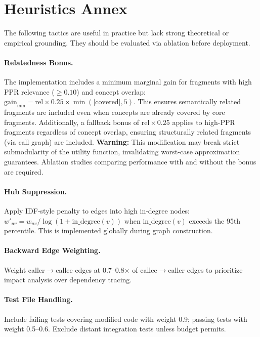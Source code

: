 \documentclass[11pt, a4paper]{article}
\begin{document}
\newpage
\section{Heuristics Annex}

The following tactics are useful in practice but lack strong theoretical or empirical grounding. They should be evaluated via ablation before deployment.

\paragraph{Relatedness Bonus.} The implementation includes a minimum marginal gain for fragments with high PPR relevance ($\geq 0.10$) and concept overlap: $\text{gain}_{\min} = \text{rel} \times 0.25 \times \min(|\text{covered}|, 5)$. This ensures semantically related fragments are included even when concepts are already covered by core fragments. Additionally, a fallback bonus of $\text{rel} \times 0.25$ applies to high-PPR fragments regardless of concept overlap, ensuring structurally related fragments (via call graph) are included. \textbf{Warning:} This modification may break strict submodularity of the utility function, invalidating worst-case approximation guarantees. Ablation studies comparing performance with and without the bonus are required.

\paragraph{Hub Suppression.} Apply IDF-style penalty to edges into high in-degree nodes: $w'_{uv} = w_{uv} / \log(1 + \text{in\_degree}(v))$ when $\text{in\_degree}(v)$ exceeds the 95th percentile. This is implemented globally during graph construction.

\paragraph{Backward Edge Weighting.} Weight caller$\to$callee edges at 0.7--0.8$\times$ of callee$\to$caller edges to prioritize impact analysis over dependency tracing.

\paragraph{Test File Handling.} Include failing tests covering modified code with weight 0.9; passing tests with weight 0.5--0.6. Exclude distant integration tests unless budget permits.
\end{document}

